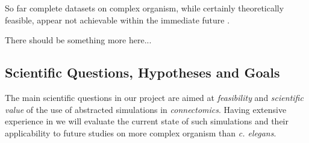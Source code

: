 \documentclass[a4paper,11pt]{article}
\begin{document}
So far complete datasets on complex organism, while certainly theoretically feasible, appear not achievable within the immediate future \citep{Gjorgjieva2014} \citep{Mikula2016}.

There should be something more here... 

\subsection{Scientific Questions, Hypotheses and Goals}

The main scientific questions in our project are aimed at \emph{feasibility} and \emph{scientific value} of the use of abstracted simulations in \emph {connectomics}. Having extensive experience in  we will evaluate the current state of such simulations and their applicability to future studies on more complex organism than \emph{c. elegans}.
\end{document}
